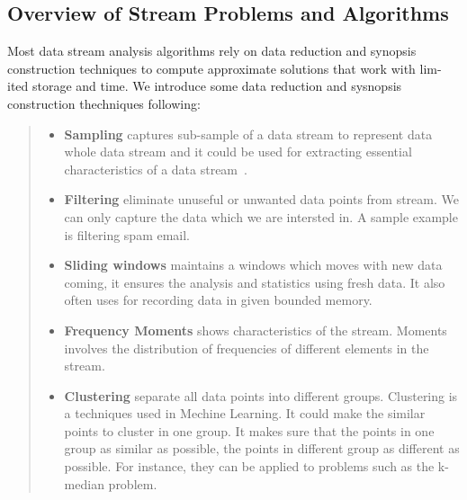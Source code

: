 \subsection{Overview of Stream Problems and Algorithms}
Most data stream analysis algorithms rely on data reduction and synopsis
construction techniques to compute approximate solutions that work with lim-ited
storage and time. We introduce some data reduction and sysnopsis construction
thechniques following:
\begin{quote}
\begin{itemize}
    \item  \textbf{Sampling} captures sub-sample of a data stream to represent
    data whole data stream and it could be used for extracting essential
    characteristics of a data stream~\cite{kejariwal2015real}.
    
    \item \textbf{Filtering} eliminate unuseful or unwanted data points from
    stream. We can only capture the data which we are intersted in. A sample
    example is filtering spam email.
    
    \item \textbf{Sliding windows} maintains a windows which moves with new data
    coming, it ensures the analysis and statistics using fresh data. It also 
    often uses for recording data in given bounded memory.

    \item \textbf{Frequency Moments} shows characteristics of the stream.
    Moments involves the distribution of frequencies of different elements in
    the stream. 
    
    
    \item \textbf{Clustering} separate all data points into different groups.
    Clustering is a techniques used in Mechine Learning. It could make the 
    similar points to cluster in one group. It makes sure that the points in one
    group as similar as possible, the points in different group as different as
    possible. For instance, they can be applied to problems such as the k-median 
    problem. 
    

\end{itemize}
\end{quote}
